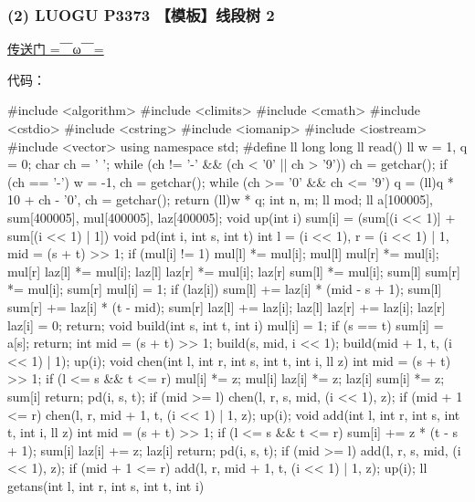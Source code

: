 \subsubsection{(2) LUOGU P3373 【模板】线段树 2}

\href{https://www.luogu.org/problem/show?pid=3372}{传送门 =￣ω￣=}

代码：

\begin{cppcode}
#include <algorithm>
#include <climits>
#include <cmath>
#include <cstdio>
#include <cstring>
#include <iomanip>
#include <iostream>
#include <vector>
using namespace std;
#define ll long long
ll read() {
  ll w = 1, q = 0;
  char ch = ' ';
  while (ch != '-' && (ch < '0' || ch > '9')) ch = getchar();
  if (ch == '-') w = -1, ch = getchar();
  while (ch >= '0' && ch <= '9') q = (ll)q * 10 + ch - '0', ch = getchar();
  return (ll)w * q;
}
int n, m;
ll mod;
ll a[100005], sum[400005], mul[400005], laz[400005];
void up(int i) { sum[i] = (sum[(i << 1)] + sum[(i << 1) | 1]) %
void pd(int i, int s, int t) {
  int l = (i << 1), r = (i << 1) | 1, mid = (s + t) >> 1;
  if (mul[i] != 1) {
    mul[l] *= mul[i];
    mul[l] %
    mul[r] *= mul[i];
    mul[r] %
    laz[l] *= mul[i];
    laz[l] %
    laz[r] *= mul[i];
    laz[r] %
    sum[l] *= mul[i];
    sum[l] %
    sum[r] *= mul[i];
    sum[r] %
    mul[i] = 1;
  }
  if (laz[i]) {
    sum[l] += laz[i] * (mid - s + 1);
    sum[l] %
    sum[r] += laz[i] * (t - mid);
    sum[r] %
    laz[l] += laz[i];
    laz[l] %
    laz[r] += laz[i];
    laz[r] %
    laz[i] = 0;
  }
  return;
}
void build(int s, int t, int i) {
  mul[i] = 1;
  if (s == t) {
    sum[i] = a[s];
    return;
  }
  int mid = (s + t) >> 1;
  build(s, mid, i << 1);
  build(mid + 1, t, (i << 1) | 1);
  up(i);
}
void chen(int l, int r, int s, int t, int i, ll z) {
  int mid = (s + t) >> 1;
  if (l <= s && t <= r) {
    mul[i] *= z;
    mul[i] %
    laz[i] *= z;
    laz[i] %
    sum[i] *= z;
    sum[i] %
    return;
  }
  pd(i, s, t);
  if (mid >= l) chen(l, r, s, mid, (i << 1), z);
  if (mid + 1 <= r) chen(l, r, mid + 1, t, (i << 1) | 1, z);
  up(i);
}
void add(int l, int r, int s, int t, int i, ll z) {
  int mid = (s + t) >> 1;
  if (l <= s && t <= r) {
    sum[i] += z * (t - s + 1);
    sum[i] %
    laz[i] += z;
    laz[i] %
    return;
  }
  pd(i, s, t);
  if (mid >= l) add(l, r, s, mid, (i << 1), z);
  if (mid + 1 <= r) add(l, r, mid + 1, t, (i << 1) | 1, z);
  up(i);
}
ll getans(int l, int r, int s, int t, int i) {
}}
\end{cppcode}
